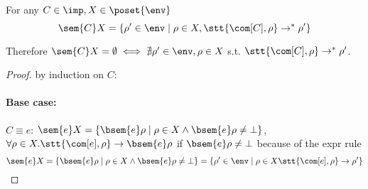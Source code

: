 \begin{lemma}\label{le:link}
  For any \(C\in\imp, X \in \poset{\env}\) \[\sem{C}X = \{\rho' \in
  \env \mid \rho \in X, \stt{\com[C], \rho} \to^* \rho'\}\]
\end{lemma}

Therefore \(\sem{C}X = \emptyset \iff \nexists \rho' \in \env, \rho
\in X\) s.t. \(\stt{\com[C], \rho} \to^* \rho'\).

\begin{proof}
  by induction on \(C\):
  \paragraph*{Base case:\\}
  \(C \equiv e\): \(\sem{e}X = \{\bsem{e}\rho \mid \rho \in X \wedge
  \bsem{e}\rho \neq \bot \}\), \(\forall \rho \in X . \stt{\com[e],
    \rho} \to \bsem{e}\rho\) if \(\bsem{e}\rho \neq \bot\) because of
  the expr rule \[\sem{e}X = \{\bsem{e}\rho \mid \rho \in X \wedge
  \bsem{e}\rho \neq \bot \} = \{\rho' \in\env \mid \rho \in X
  \stt{\com[e], \rho} \to \rho'\}\]

\end{proof}
